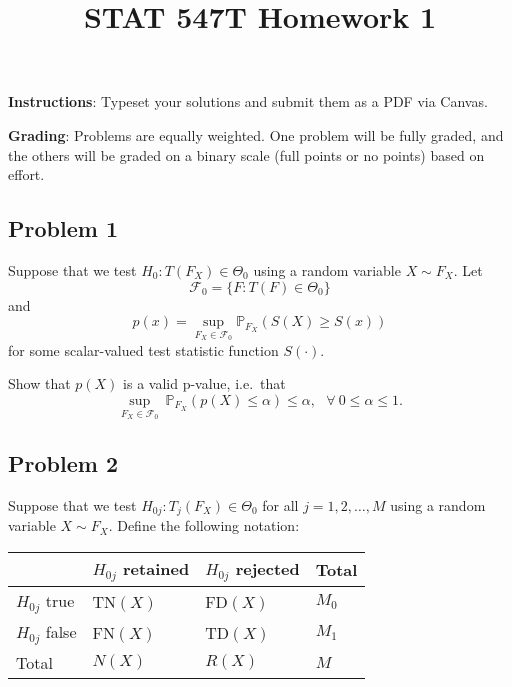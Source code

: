 \documentclass[
  letterpaper,
  DIV=11,
  numbers=noendperiod]{scrartcl}
\title{STAT 547T Homework 1}
\author{}
\date{}
\begin{document}
\maketitle
\ifdefined\Shaded\renewenvironment{Shaded}{\begin{tcolorbox}[boxrule=0pt, sharp corners, breakable, interior hidden, borderline west={3pt}{0pt}{shadecolor}, enhanced, frame hidden]}{\end{tcolorbox}}\fi

\textbf{Instructions}: Typeset your solutions and submit them as a PDF
via Canvas.

\textbf{Grading}: Problems are equally weighted. One problem will be
fully graded, and the others will be graded on a binary scale (full
points or no points) based on effort.

\hypertarget{problem-1}{%
\subsection{Problem 1}\label{problem-1}}

Suppose that we test \(H_0: T(F_X) \in \Theta_0\) using a random
variable \(X \sim F_X\). Let
\[\mathcal{F}_0 = \{F: T(F) \in \Theta_0\}\] and
\[p(x) = \underset{F_X \in \mathcal{F}_0}{\sup} \mathbb{P}_{F_X}(S(X) \geq S(x))\]
for some scalar-valued test statistic function \(S(\cdot)\).

Show that \(p(X)\) is a valid p-value, i.e.~that
\[\underset{F_X \in \mathcal{F}_0}{\sup} ~ \mathbb{P}_{F_X}(p(X) \leq \alpha) \leq \alpha, ~~~ \forall ~ 0 \leq \alpha \leq 1.\]

\hypertarget{problem-2}{%
\subsection{Problem 2}\label{problem-2}}

Suppose that we test \(H_{0j}: T_j(F_X) \in \Theta_0\) for all
\(j = 1, 2, \ldots, M\) using a random variable \(X \sim F_X\). Define
the following notation:

\begin{longtable}[]{@{}llll@{}}
\toprule\noalign{}
& \(H_{0j}\) retained & \(H_{0j}\) rejected & Total \\
\midrule\noalign{}
\endhead
\bottomrule\noalign{}
\endlastfoot
\(H_{0j}\) true & TN\((X)\) & FD\((X)\) & \(M_0\) \\
\(H_{0j}\) false & FN\((X)\) & TD\((X)\) & \(M_1\) \\
Total & \(N(X)\) & \(R(X)\) & \(M\) \\
\end{longtable}
\end{document}
